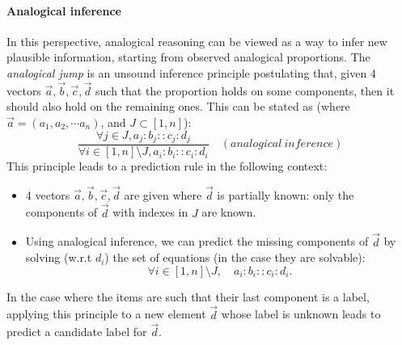 \documentclass{llncs}
\begin{document}
\paragraph{Analogical inference\\}
In this perspective, analogical reasoning can be viewed as a way to infer new
plausible information, starting from observed analogical proportions.
The {\it analogical jump} is an unsound
inference principle postulating that, given 4 vectors
$\vec{a},\vec{b},\vec{c}, \vec{d}$
such that the proportion holds  on some components, then it should also hold on the
remaining ones.  This can be stated as (where $\vec{a} = (a_1, a_2, \cdots
a_n)$, and $J \subset [1,n]$): $$\frac{\forall j \in J,
a_j:b_j::c_j:d_j}{\forall i \in [1,n] \setminus J, a_i:b_i::c_i:d_i} \quad
(analogical ~ inference)$$ 
\noindent
This principle leads to a prediction rule in the following context:  
\begin{itemize}
\item 4 vectors $\vec{a},\vec{b},\vec{c},
\vec{d}$ are given where $\vec{d}$ is partially known: only the
components of $\vec{d}$ with indexes in $J$ are known. 
\item Using analogical inference, we can
predict the missing components of $\vec{d}$ by solving (w.r.t $d_i$) the set of
equations (in the case they are solvable): $$\forall i \in [1,n]
\setminus J, \quad a_i:b_i::c_i:d_i.$$
\end{itemize}
In the case where the items are such that their last component is a label,
applying this principle to a new element $\vec{d}$ whose label is
unknown leads to predict a candidate label for $\vec{d}$. 
\end{document}
